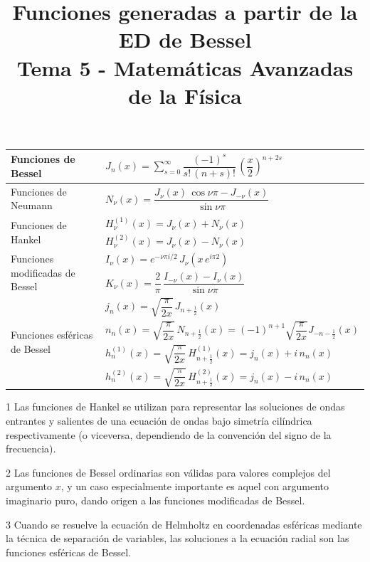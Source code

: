 
\setlength{\jot}{12pt}
\title{Funciones generadas a partir de la ED de Bessel \\ {\large Tema 5 - Matemáticas Avanzadas de la Física}\vspace{-1.5\baselineskip}}
\author{}
\date{}

\maketitle
\fontsize{14}{14}\selectfont
\begin{table}[H]
{\renewcommand{\arraystretch}{1.75}%
\begin{threeparttable}
\begin{tabular}{p{6cm} l}
Funciones de Bessel & $J_{n}(x) = \sum_{s=0}^{\infty} \dfrac{(-1)^{s}}{s!\, (n + s)!} \, \left( \dfrac{x}{2} \right)^{n+2s}$ \\ \hline
Funciones de Neumann & $N_{\nu} (x) = \dfrac{J_{\nu}(x) \, \cos \nu \pi - J_{-\nu}(x)}{\sin \nu \pi}$ \\ \hline
\multirow{2}{*}{Funciones de Hankel\tnote{1}} & $ H_{\nu}^{(1)} (x) = J_{\nu} (x) + N_{\nu}(x)$ \\
& $ H_{\nu}^{(2)} (x) = J_{\nu} (x) - N_{\nu}(x)$ \\ \hline
\multirow{2}{*}{Funciones modificadas de Bessel\tnote{2}} & $I_{\nu}(x) = e^{-\nu \pi i /2} \, J_{\nu} (x \, e^{i \pi 2})$ \\
 & $K_{\nu} (x) = \dfrac{2}{\pi} \, \dfrac{I_{-\nu}(x) - I_{\nu} (x)}{\sin \nu \pi}$ \\ \hline
 \multirow{4}{*}{Funciones esféricas de Bessel\tnote{3}} & $j_{n} (x) = \sqrt{\dfrac{\pi}{2 x}} \, J_{n+\frac{1}{2}} (x)$ \\
 & $n_{n} (x) = \sqrt{\dfrac{\pi}{2 x}} \, N_{n+\frac{1}{2}} (x) = (-1)^{n+1} \sqrt{\dfrac{\pi}{2 x}} J_{-n-\frac{1}{2}} (x)$ \\
 & $h_{n}^{(1)} (x) = \sqrt{\dfrac{\pi}{2 x}} \, H_{n+\frac{1}{2}}^{(1)} (x) = j_{n}(x) + i \, n_{n} (x)$ \\
 & $h_{n}^{(2)} (x) = \sqrt{\dfrac{\pi}{2 x}} \, H_{n+\frac{1}{2}}^{(2)} (x) = j_{n}(x) - i \, n_{n} (x)$ \\ \hline
\end{tabular}
\begin{tablenotes}
\item[1] \footnotesize Las funciones de Hankel se utilizan para representar las soluciones de ondas entrantes y salientes de una ecuación de ondas bajo simetría cilíndrica respectivamente (o viceversa, dependiendo de la convención del signo de la frecuencia). 
\item[2] Las funciones de Bessel ordinarias son válidas para valores complejos del argumento $x$, y un caso especialmente importante es aquel con argumento imaginario puro, dando origen a las funciones modificadas de Bessel.
\item[3] Cuando se resuelve la ecuación de Helmholtz en coordenadas esféricas mediante la técnica de separación de variables, las soluciones a la ecuación radial son las funciones esféricas de Bessel.
\end{tablenotes}
\end{threeparttable}}
\end{table}
